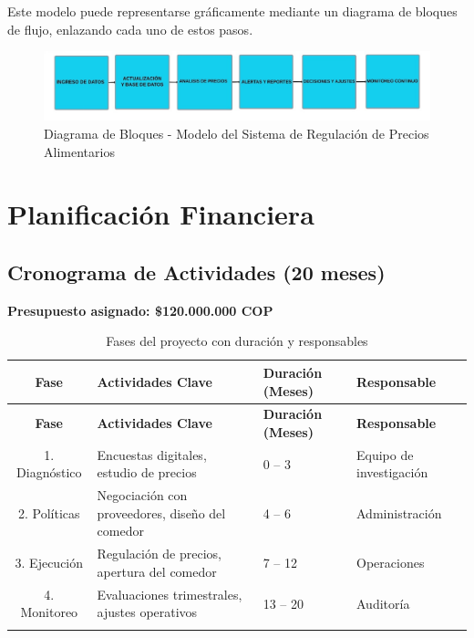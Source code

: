 \documentclass[letterpaper, 11pt]{report}
\begin{document}
Este modelo puede representarse gráficamente mediante un diagrama de bloques de
flujo, enlazando cada uno de estos pasos.

\begin{figure}[H]
      \begin{center}
            \includegraphics[width=\linewidth]{./Images/diagrama_bloques.jpg}
            \caption{Diagrama de Bloques - Modelo del Sistema de Regulación de Precios Alimentarios}
      \end{center}
\end{figure}

\section{Planificación Financiera}

\subsection{Cronograma de Actividades (20 meses)}

\noindent\textbf{Presupuesto asignado: \$120.000.000 COP}

\vspace{0.5cm}

\begin{longtable}{|c|p{.4\linewidth}|p{.2\linewidth}|p{.2\linewidth}|}
      \hline

      \textbf{Fase}  & \textbf{Actividades Clave}                      & \textbf{Duración (Meses)} & \textbf{Responsable}    \\
      \hline
      \endfirsthead

      \hline

      \textbf{Fase}  & \textbf{Actividades Clave}                      & \textbf{Duración (Meses)} & \textbf{Responsable}    \\
      \hline
      \endhead

      1. Diagnóstico & Encuestas digitales, estudio de precios         & 0 -- 3                    & Equipo de investigación \\
      \hline
      2. Políticas   & Negociación con proveedores, diseño del comedor & 4 -- 6                    & Administración          \\
      \hline
      3. Ejecución   & Regulación de precios, apertura del comedor     & 7 -- 12                   & Operaciones             \\
      \hline
      4. Monitoreo   & Evaluaciones trimestrales, ajustes operativos   & 13 -- 20                  & Auditoría               \\
      \hline

      \caption{Fases del proyecto con duración y responsables}
\end{longtable}
\end{document}
